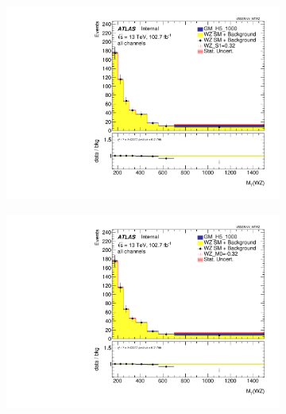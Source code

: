 \documentclass[../Bachelorarbeit.tex]{subfiles}
\begin{document}
\begin{figure}[h]

    \centering
    \begin{subfigure}{0.35\textwidth}
        \includegraphics[width=\textwidth]{Plots/ALL_MTWZ_right_color/GM_H5_1000/S1/2022-05-07/VBSSR/all_VV_MTWZ.pdf}
    \end{subfigure}
    \begin{subfigure}{0.35\textwidth}
        \includegraphics[width=\textwidth]{Plots/ALL_MTWZ_right_color/GM_H5_1000/M0/2022-05-07/VBSSR/all_VV_MTWZ.pdf}
    \end{subfigure}
    \begin{subfigure}{0.35\textwidth}

\end{subfigure}
\end{figure}
\end{document}
